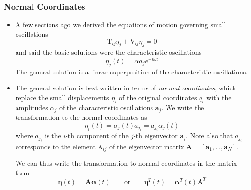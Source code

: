 \documentclass[11pt, a4paper]{article}
\newcommand{\eqtext}[1]{\qquad \text{#1} \qquad}
\newcommand{\mat}[1]{\mathbf{#1}} %
\begin{document}
\subsubsection{Normal Coordinates}
\begin{itemize}
	\item A few sections ago we derived the equations of motion governing small oscillations
	\begin{equation*}
		\mathrm{T}_{ij} \ddot{\eta}_{j} + \mathrm{V}_{ij} \eta_{j} = 0
	\end{equation*}
	and said the basic solutions were the characteristic oscillations
	\begin{equation*}
		\eta_{j}(t) = \alpha a_{j} e^{-i\omega t}
	\end{equation*}
	The general solution is a linear superposition of the characteristic oscillations. 
	
	\item The general solution is best written in terms of \textit{normal coordinates}, which replace the small displacements $ \eta_{i} $ of the original coordinates $ q_{i} $ with the amplitudes $ \alpha_{j} $ of the characteristic oscillations $ \bm{a}_{j} $. We write the transformation to the normal coordinates as
	\begin{equation*}
		\eta_{i}(t) = \alpha_{j}(t) a_{j_{i}} =  a_{j_{i}} \alpha_{j}(t)
	\end{equation*}
	where $ a_{j_{i}} $ is the $ i $-th component of the $ j $-th eigenvector $ \bm{a}_{j} $. Note also that $ a_{j_{i}} $ corresponds to the element $ \mathrm{A}_{ij} $ of the eigenvector matrix $ \mat{A} = [\bm{a}_{1}, \ldots, \bm{a}_{N}] $.
	
	We can thus write the transformation to normal coordinates in the matrix form
	\begin{equation*}
		\bm{\eta}(t) = \mat{A} \bm{\alpha}(t) \eqtext{or} \bm{\eta}^{T}(t) = \bm{\alpha}^{T}(t) \mat{A}^{T} 
	\end{equation*}
	

\end{itemize}
\end{document}
